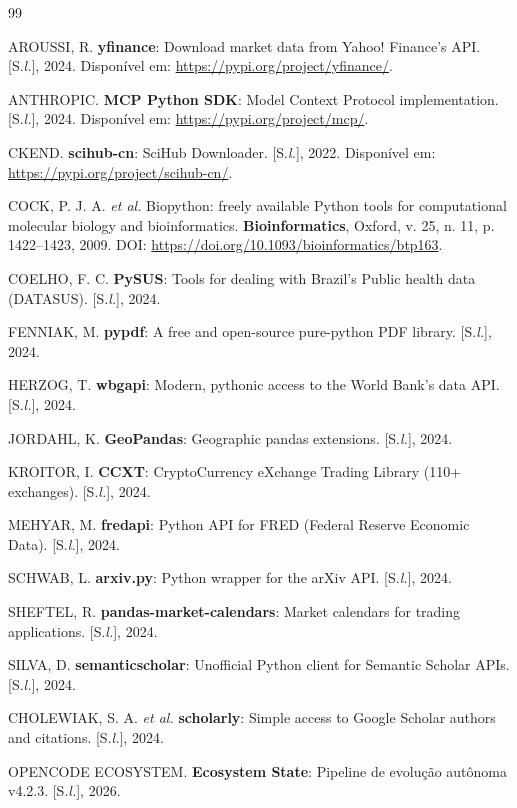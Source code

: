 \documentclass[12pt,a4paper]{article}
\begin{document}
\begin{thebibliography}{99}

AROUSSI, R. \textbf{yfinance}: Download market data from Yahoo! Finance's API. [S.\textit{l.}], 2024.
Disponível em: \url{https://pypi.org/project/yfinance/}.

ANTHROPIC. \textbf{MCP Python SDK}: Model Context Protocol implementation. [S.\textit{l.}], 2024.
Disponível em: \url{https://pypi.org/project/mcp/}.

CKEND. \textbf{scihub-cn}: SciHub Downloader. [S.\textit{l.}], 2022.
Disponível em: \url{https://pypi.org/project/scihub-cn/}.

COCK, P. J. A. \textit{et al.} Biopython: freely available Python tools for computational
molecular biology and bioinformatics. \textbf{Bioinformatics}, Oxford, v. 25, n. 11,
p. 1422--1423, 2009. DOI: \url{https://doi.org/10.1093/bioinformatics/btp163}.

COELHO, F. C. \textbf{PySUS}: Tools for dealing with Brazil's Public health data (DATASUS).
[S.\textit{l.}], 2024.

FENNIAK, M. \textbf{pypdf}: A free and open-source pure-python PDF library. [S.\textit{l.}], 2024.

HERZOG, T. \textbf{wbgapi}: Modern, pythonic access to the World Bank's data API. [S.\textit{l.}], 2024.

JORDAHL, K. \textbf{GeoPandas}: Geographic pandas extensions. [S.\textit{l.}], 2024.

KROITOR, I. \textbf{CCXT}: CryptoCurrency eXchange Trading Library (110+ exchanges). [S.\textit{l.}], 2024.

MEHYAR, M. \textbf{fredapi}: Python API for FRED (Federal Reserve Economic Data). [S.\textit{l.}], 2024.

SCHWAB, L. \textbf{arxiv.py}: Python wrapper for the arXiv API. [S.\textit{l.}], 2024.

SHEFTEL, R. \textbf{pandas-market-calendars}: Market calendars for trading applications. [S.\textit{l.}], 2024.

SILVA, D. \textbf{semanticscholar}: Unofficial Python client for Semantic Scholar APIs. [S.\textit{l.}], 2024.

CHOLEWIAK, S. A. \textit{et al.} \textbf{scholarly}: Simple access to Google Scholar authors and citations. [S.\textit{l.}], 2024.

OPENCODE ECOSYSTEM. \textbf{Ecosystem State}: Pipeline de evolução autônoma v4.2.3. [S.\textit{l.}], 2026.

\end{thebibliography}
\end{document}
